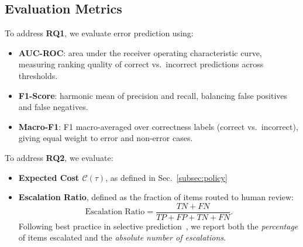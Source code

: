 \subsection{Evaluation Metrics}
To address \textbf{RQ1}, we evaluate error prediction using:
\begin{itemize}
    \item \textbf{AUC-ROC}: area under the receiver operating characteristic curve, measuring ranking quality of correct vs.\ incorrect predictions across thresholds.
    \item \textbf{F1-Score}: harmonic mean of precision and recall, balancing false positives and false negatives.
    \item \textbf{Macro-F1}: F1 macro-averaged over correctness labels (correct vs.\ incorrect), giving equal weight to error and non-error cases.
\end{itemize}
To address \textbf{RQ2}, we evaluate:
\begin{itemize}
    \item \textbf{Expected Cost $\mathcal{C}(\tau)$}, as defined in Sec.~\ref{subsec:policy}
    \item \textbf{Escalation Ratio}, defined as the fraction of items routed to human review:
    \[
    \text{Escalation Ratio} = \frac{TN + FN}{TP + FP + TN + FN}.
    \]
    Following best practice in selective prediction~\cite{geifman2017selectiveclassificationdeepneural,hendrycks2017a}, we report both the \emph{percentage} of items escalated and the \emph{absolute number of escalations}.
\end{itemize}